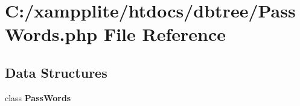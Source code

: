 \section{C:/xampplite/htdocs/dbtree/PassWords.php File Reference}
\label{_pass_words_8php}
\subsection*{Data Structures}
\begin{DoxyCompactItemize}
\item 
class {\bf PassWords}
\end{DoxyCompactItemize}
